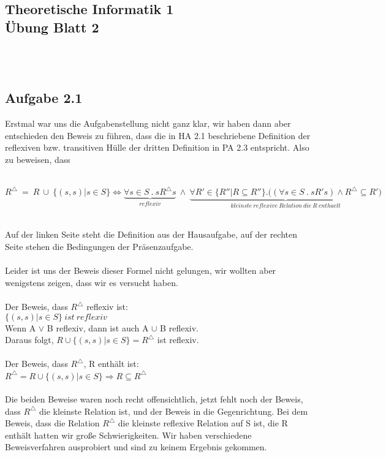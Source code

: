 \documentclass[11pt,a4paper]{article}
\begin{document}
\begin{center}
\section*{ Theoretische Informatik 1 \\ Übung Blatt 2}
\end{center}
\ \\ \ \\
\subsection*{Aufgabe 2.1}
Erstmal war uns die Aufgabenstellung nicht ganz klar, wir haben dann aber entschieden den Beweis zu führen, 
dass die in HA 2.1 beschriebene Definition der reflexiven bzw. transitiven Hülle der dritten Definition in 
PA 2.3 entspricht. Also zu beweisen, dass\\
\ \\
\begin{small}
$R^\triangle ~=~ R~ \cup ~ \{(s,s)|s \in S\} \Leftrightarrow \underset{reflexiv}{\underbrace{\forall s \in S~.~s R^\triangle s}} ~\wedge~ \underset{kleinste ~ reflexive ~ Relation ~ die ~ R ~ enthaelt}{\underbrace{\forall R' \in \{R''| R \subseteq R''\}. \big (( \forall s \in S ~.~ sR's) \wedge R^\triangle \subseteq R' \big )}}$
\end{small}\\
Auf der linken Seite steht die Definition aus der Hausaufgabe, auf der rechten Seite stehen die Bedingungen der Präsenzaufgabe.\\
\ \\
Leider ist uns der Beweis dieser Formel nicht gelungen, wir wollten aber wenigstens zeigen, dass wir es versucht haben.\\
\ \\
Der Beweis, dass $R^\triangle$ reflexiv ist:\\
$\{(s,s)|s \in S\} ~ist ~reflexiv$\\
Wenn A $\vee$ B reflexiv, dann ist auch A $\cup$ B reflexiv.\\
Daraus folgt, $R \cup \{(s,s)|s \in S\}=R^\triangle$ ist reflexiv.\\
\ \\
Der Beweis, dass $R^\triangle$, R enthält ist:\\
$R^\triangle = R \cup \{(s,s)|s \in S \} \Rightarrow R \subseteq R^\triangle$\\
\ \\
Die beiden Beweise waren noch recht offensichtlich, jetzt fehlt noch der Beweis, dass $R^\triangle$ die kleinste Relation ist, und der Beweis in die Gegenrichtung. Bei dem Beweis, dass die Relation $R^\triangle$ die kleinste reflexive Relation auf S ist, die R enthält hatten wir große Schwierigkeiten. Wir haben verschiedene Beweisverfahren ausprobiert und sind zu keinem Ergebnis gekommen.\\
\end{document}
